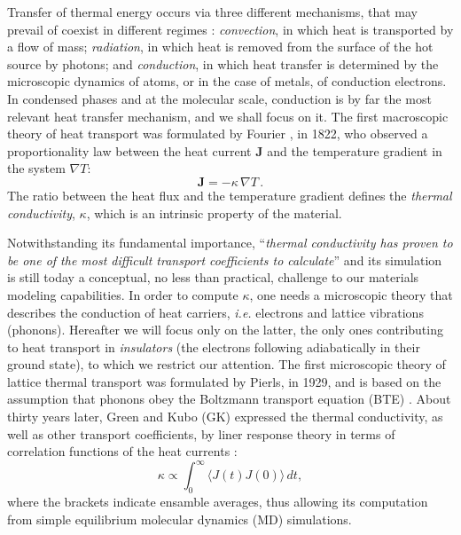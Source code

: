Transfer of thermal energy occurs via three different mechanisms, that may prevail of coexist in different regimes \cite{Lienhard2017}: \emph{convection}, in which heat is transported by a flow of mass; \emph{radiation}, in which heat is removed from the surface of the hot source by photons; and \emph{conduction}, in which heat transfer is determined by the microscopic dynamics of atoms, or in the case of metals, of conduction electrons. 
In condensed phases and at the molecular scale, conduction is by far the most relevant heat transfer mechanism, and we shall focus on it. 
The first macroscopic theory of heat transport was formulated by Fourier \cite{Fourier1878}, in 1822, who observed a proportionality law between the heat current $\mathbf{J}$ and the temperature gradient in the system $\nabla T$:
\begin{equation}
    \mathbf{J} = -\kappa\, \nabla T \,.  \label{eq:Fourier-law}
\end{equation}
The ratio between the heat flux and the temperature gradient defines the \emph{thermal conductivity}, $\kappa$, which is an intrinsic property of the material. 

Notwithstanding its fundamental importance, ``\emph{thermal conductivity has proven to be one of the most difficult transport coefficients to calculate}'' \cite{Evans1990} and its simulation is still today a conceptual, no less than practical, challenge to our materials modeling capabilities. 
In order to compute $\kappa$, one needs a microscopic theory that describes the conduction of heat carriers, \emph{i.e.} electrons and lattice vibrations (phonons). Hereafter we will focus only on the latter, the only ones contributing to heat transport in \emph{insulators} (the electrons following adiabatically in their ground state), to which we restrict our attention. 
The first microscopic theory of lattice thermal transport was formulated by Pierls, in 1929, and is based on the assumption that phonons obey the Boltzmann transport equation (BTE) \cite{Peierls1929}. 
About thirty years later, Green and Kubo (GK) expressed the thermal conductivity, as well as other transport coefficients, by liner response theory in terms of correlation functions of the heat currents \cite{Green1952,Green1954,Kubo1957a,Kubo1957b,Zwanzig1965}:
\begin{equation}
    \kappa \propto \int_{0}^{\infty}\!\langle{J}(t){J}(0)\rangle\, dt, \label{eq:GK-intro}
\end{equation}
where the brackets indicate ensamble averages, thus allowing its computation from simple equilibrium molecular dynamics (MD) simulations. 

